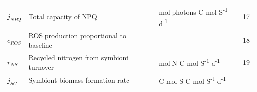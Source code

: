 \documentclass[]{elsarticle} %
\begin{document}
\begin{longtable}[]{@{}llll@{}}
\begin{minipage}[t]{0.09\columnwidth}
\(j_{NPQ}\)\strut
\end{minipage} & \begin{minipage}[t]{0.44\columnwidth}\raggedright\strut
Total capacity of NPQ\strut
\end{minipage} & \begin{minipage}[t]{0.26\columnwidth}\raggedright\strut
mol photons C-mol S\textsuperscript{-1} d\textsuperscript{-1}\strut
\end{minipage} & \begin{minipage}[t]{0.09\columnwidth}\raggedright\strut
17\strut
\end{minipage}\tabularnewline
\begin{minipage}[t]{0.09\columnwidth}\raggedright\strut
\(c_{ROS}\)\strut
\end{minipage} & \begin{minipage}[t]{0.44\columnwidth}\raggedright\strut
ROS production proportional to baseline\strut
\end{minipage} & \begin{minipage}[t]{0.26\columnwidth}\raggedright\strut
--\strut
\end{minipage} & \begin{minipage}[t]{0.09\columnwidth}\raggedright\strut
18\strut
\end{minipage}\tabularnewline
\begin{minipage}[t]{0.09\columnwidth}\raggedright\strut
\(r_{NS}\)\strut
\end{minipage} & \begin{minipage}[t]{0.44\columnwidth}\raggedright\strut
Recycled nitrogen from symbiont turnover\strut
\end{minipage} & \begin{minipage}[t]{0.26\columnwidth}\raggedright\strut
mol N C-mol S\textsuperscript{-1} d\textsuperscript{-1}\strut
\end{minipage} & \begin{minipage}[t]{0.09\columnwidth}\raggedright\strut
19\strut
\end{minipage}\tabularnewline
\begin{minipage}[t]{0.09\columnwidth}\raggedright\strut
\(j_{SG}\)\strut
\end{minipage} & \begin{minipage}[t]{0.44\columnwidth}\raggedright\strut
Symbiont biomass formation rate\strut
\end{minipage} & \begin{minipage}[t]{0.26\columnwidth}\raggedright\strut
C-mol S C-mol S\textsuperscript{-1} d\textsuperscript{-1}\strut

\end{minipage}
\end{longtable}
\end{document}
